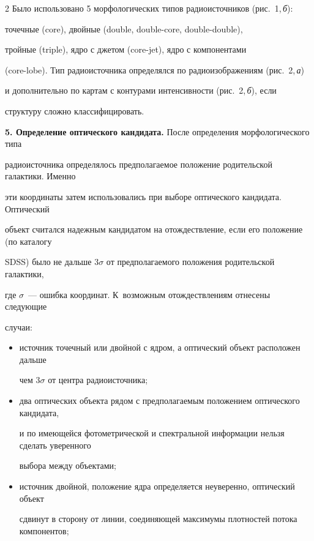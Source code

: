 \begin{multicols}{2}
      Было использовано 5 морфологических типов радиоисточников (рис.~1,\,\textit{б}): 

точечные ({core}), двойные ({double}, {double-core}, {double-double}), 

тройные ({triple}), ядро с джетом ({core-jet}), ядро с компонентами 

      ({core-lobe}). Тип радиоисточника определялся по радиоизображениям (рис.~2,\,\textit{а}) 

      и дополнительно по картам с контурами интенсивности (рис.~2,\,\textit{б}), если 

структуру сложно классифицировать.








\textbf{5. Определение оптического кандидата.} После определения морфологического типа 

радиоисточника определялось предполагаемое положение родительской галактики. Именно 

эти координаты затем использовались при выборе оптического кандидата. Оптический 

объект считался надежным кандидатом на отождествление, если его положение (по каталогу 

SDSS) было не дальше $3\sigma$ от предполагаемого положения родительской галактики, 

где $\sigma$~--- ошибка координат. К~возможным отождествлениям отнесены следующие 

случаи:

\begin{itemize}

\item источник точечный или двойной с ядром, а оптический объект расположен дальше 

чем $3\sigma$ от центра радиоисточника; 

\item два оптических объекта рядом с предполагаемым положением оптического кандидата, 

и по имеющейся фотометрической и спектральной информации нельзя сделать уверенного 

выбора между объектами; 

\item источник двойной, положение ядра определяется неуверенно, оптический объект 

сдвинут в сторону от линии, соединяющей максимумы плотностей потока компонентов;


\end{itemize}
\end{multicols}
